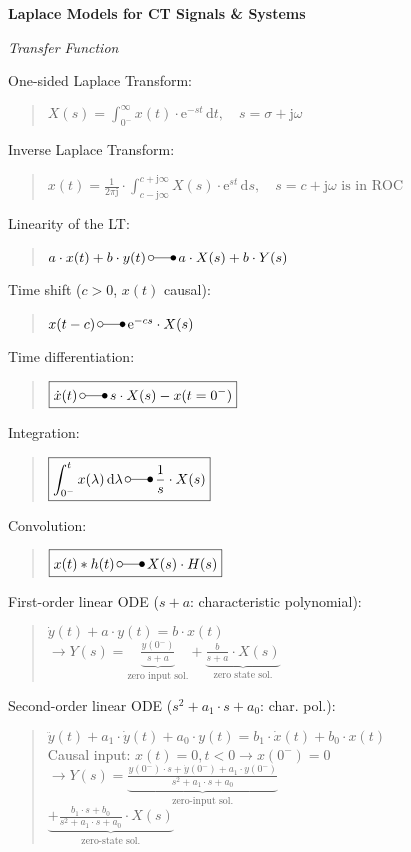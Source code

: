 \documentclass[fontsize=9pt,a4paper,twocolumn]{scrartcl}
\begin{document}
\large{\textbf{Laplace Models for CT Signals \& Systems}}

\textit{Transfer Function}

One-sided Laplace Transform:
\begin{quote}
	$\boxed{X(s)=\int_{0^-}^\infty x(t)\cdot\mathrm{e}^{-st}\,\mathrm{d}t,\quad s=\sigma+\mathrm{j}\omega}$
\end{quote}

Inverse Laplace Transform:
\begin{quote}
	$x(t)=\frac{1}{2\pi\mathrm{j}}\cdot\int_{c-\mathrm{j}\infty}^{c+\mathrm{j}\infty} X(s)\cdot\mathrm{e}^{st}\,\mathrm{d}s,\quad s=c+\mathrm{j}\omega\text{ is in ROC}$
\end{quote}

Linearity of the LT:
\begin{quote}
	$a\cdot x(t)+b\cdot y(t)\,\laplace\,a\cdot X(s)+b\cdot Y(s)$
\end{quote}

Time shift ($c>0$, $x(t)$ causal):
\begin{quote}
	$x(t-c)\,\laplace\,\mathrm{e}^{-cs}\cdot X(s)$
\end{quote}

Time differentiation:
\begin{quote}
	$\boxed{\dot x(t)\,\laplace\,s\cdot X(s)-x(t=0^-)}$
\end{quote}

Integration:
\begin{quote}
	$\boxed{\int_{0^-}^t x(\lambda)\,\mathrm{d}\lambda\,\laplace\,\frac{1}{s}\cdot X(s)}$
\end{quote}

Convolution:
\begin{quote}
	$\boxed{x(t)*h(t)\,\laplace\,X(s)\cdot H(s)}$
\end{quote}

First-order linear ODE ($s+a$: characteristic polynomial):
\begin{quote}
	$\dot y(t)+a\cdot y(t)=b\cdot x(t)$\\
	$\to Y(s)=\underbrace{\frac{y(0^-)}{s+a}}_{\text{zero input sol.}}+\underbrace{\frac{b}{s+a}\cdot X(s)}_{\text{zero state sol.}}$
\end{quote}

Second-order linear ODE ($s^2+a_1\cdot s+a_0$: char. pol.):
\begin{quote}
	$\ddot y(t)+a_1\cdot\dot y(t)+a_0\cdot y(t)=b_1\cdot\dot x(t)+b_0\cdot x(t)$\vspace*{0.25cm}\\
	\vspace*{0.25cm}Causal input: $x(t)=0, t<0\to x(0^-)=0$\\
	$\to Y(s)=\underbrace{\frac{y(0^-)\cdot s+\dot y(0^-)+a_1\cdot y(0^-)}{s^2+a_1\cdot s+a_0}}_{\text{zero-input sol.}}$\\\hspace*{1.5cm}$\underbrace{+\frac{b_1\cdot s+b_0}{s^2+a_1\cdot s+a_0}\cdot X(s)}_{\text{zero-state sol.}}$
\end{quote}
\end{document}
